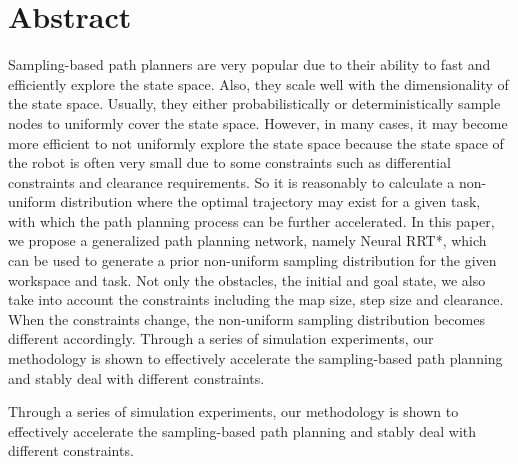 %
\chapter*{Abstract}
\label{sec:abstract}
\vspace*{-10mm}

\noindent Sampling-based path planners are very popular due to their ability to fast and efficiently explore the state space. 
Also, they scale well with the dimensionality of the state space.
Usually, they either probabilistically or deterministically sample nodes to uniformly cover the state space.
However, in many cases, it may become more efficient to not uniformly explore the state space because the state space of the robot is often very small due to some constraints such as differential constraints and clearance requirements.
So it is reasonably to calculate a non-uniform distribution where the optimal trajectory may exist for a given task, with which the path planning process can be further accelerated.
In this paper, we propose a generalized path planning network, namely Neural RRT*, which can be used to generate a prior non-uniform sampling distribution for the given workspace and task.
Not only the obstacles, the initial and goal state, we also take into account the constraints including the map size, step size and clearance.
When the constraints change, the non-uniform sampling distribution becomes different accordingly.
Through a series of simulation experiments, our methodology is shown to effectively accelerate the sampling-based path planning and stably deal with different constraints.

\textrm{Through a series of simulation experiments, our methodology is shown to effectively accelerate the sampling-based path planning and stably deal with different constraints.}

\vspace*{15mm}



